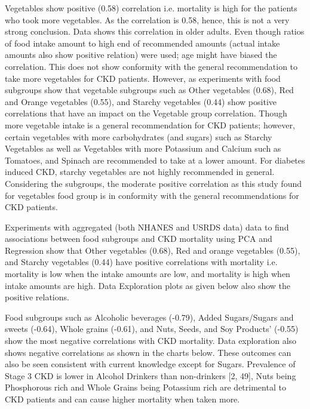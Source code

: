 \noindent Vegetables show positive (0.58) correlation i.e. mortality is high for the patients who took more vegetables. As the correlation is 0.58, hence, this is not a very strong conclusion. Data shows this correlation in older adults. Even though ratios of food intake amount to high end of recommended amounts (actual intake amounts also show positive relation) were used; age might have biased the correlation. This does not show conformity with the general recommendation to take more vegetables for CKD patients. However, as experiments with food subgroups show that vegetable subgroups such as Other vegetables (0.68), Red and Orange vegetables (0.55), and Starchy vegetables (0.44) show positive correlations that have an impact on the Vegetable group correlation.  Though more vegetable intake is a general recommendation for CKD patients; however, certain vegetables with more carbohydrates (and sugars) such as Starchy Vegetables as well as Vegetables with more Potassium and Calcium such as Tomatoes, and Spinach are recommended to take at a lower amount. For diabetes induced CKD, starchy vegetables are not highly recommended in general. Considering the subgroups, the moderate positive correlation as this study found for vegetables food group is in conformity with the general recommendations for CKD patients.

\noindent Experiments with aggregated (both NHANES and USRDS data) data to find associations between food subgroups and CKD mortality using PCA and Regression show that  Other vegetables (0.68),    Red and orange vegetables (0.55), and Starchy vegetables (0.44)  have positive correlations with mortality i.e. mortality is low when the intake amounts are low, and mortality is high when intake amounts are high. Data Exploration plots as given below also show the positive relations.

\noindent  Food subgroups such as Alcoholic beverages (-0.79),    Added Sugars/Sugars and sweets (-0.64), Whole grains (-0.61), and  Nuts, Seeds, and Soy Products’ (-0.55) show the most negative correlations with CKD mortality. Data exploration also shows negative correlations as shown in the charts below. These outcomes can also be seen consistent with current knowledge except for Sugars. Prevalence of Stage 3 CKD is lower in Alcohol Drinkers than non-drinkers [2, 49], Nuts being Phosphorous rich and Whole Grains being Potassium rich are detrimental to CKD patients and can cause higher mortality when taken more.

